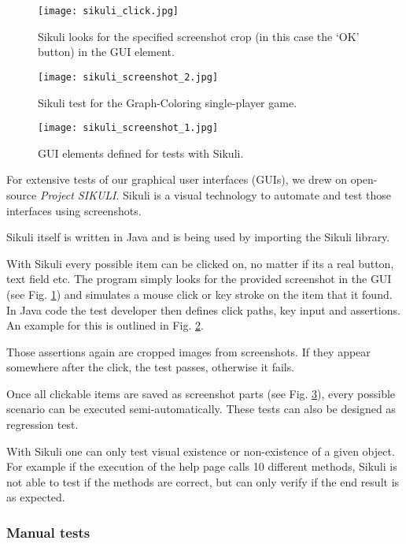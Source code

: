 \begin{figure}[!h]
	\centering
	\texttt{[image: sikuli\_click.jpg]}
	\caption{Sikuli looks for the specified screenshot crop (in this case the `OK' button) in the GUI element.}
	\label{img:screenSikuli1}
\end{figure}
\begin{figure}[!h]
	\centering
	\texttt{[image: sikuli\_screenshot\_2.jpg]}
	\caption{Sikuli test for the Graph-Coloring single-player game.}
	\label{img:screenSikuli2}
\end{figure}
\begin{figure}[!h]
	\centering
	\texttt{[image: sikuli\_screenshot\_1.jpg]}
	\caption{GUI elements defined for tests with Sikuli.}
	\label{img:screenSikuli3}
\end{figure}
For extensive tests of our graphical user interfaces (GUIs), we drew on open-source \emph{Project SIKULI}. Sikuli is a visual technology to automate and test those interfaces using screenshots.\par
Sikuli itself is written in Java and is being used by importing the Sikuli library.\par
With Sikuli every possible item can be clicked on, no matter if its a real button, text field etc. The program simply looks for the provided screenshot in the GUI (see Fig. \ref{img:screenSikuli1}) and simulates a mouse click or key stroke on the item that it found. In Java code the test developer then defines click paths, key input and assertions. An example for this is outlined in Fig. \ref{img:screenSikuli2}.\par
Those assertions again are cropped images from screenshots. If they appear somewhere after the click, the test passes, otherwise it fails.\par
Once all clickable items are saved as screenshot parts (see Fig. \ref{img:screenSikuli3}), every possible scenario can be executed semi-automatically. These tests can also be designed as regression test.\par
With Sikuli one can only test visual existence or non-existence of a given object. For example if the execution of the help page calls 10 different methods, Sikuli is not able to test if the methods are correct, but can only verify if the end result is as expected.\par

\subsubsection{Manual tests}

